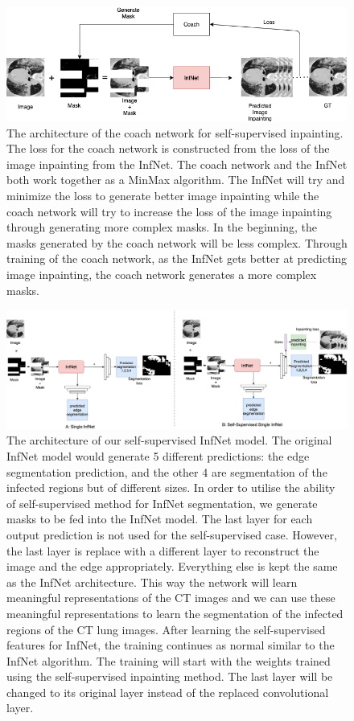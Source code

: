 \begin{figure}
	\centering
	\includegraphics[width=\linewidth]{coach.png}
	\caption{The architecture of the coach network for self-supervised inpainting. The loss for the coach network is constructed from the loss of the image inpainting from the InfNet. The coach network and the InfNet both work together as a MinMax algorithm. The InfNet will try and minimize the loss to generate better image inpainting while the coach network will try to increase the loss of the image inpainting through generating more complex masks. In the beginning, the masks generated by the coach network will be less complex. Through training of the coach network, as the InfNet gets better at predicting image inpainting, the coach network generates a more complex masks.}
\end{figure}

\begin{figure}
	\centering
	\includegraphics[width=\linewidth]{self-super-inf-net.png}
	\caption{The architecture of our self-supervised InfNet model. The original InfNet model would generate 5 different predictions: the edge segmentation prediction, and the other 4 are segmentation of the infected regions but of different sizes. In order to utilise the ability of self-supervised method for InfNet segmentation, we generate masks to be fed into the InfNet model. The last layer for each output prediction is not used for the self-supervised case. However, the last layer is replace with a different layer to reconstruct the image and the edge appropriately. Everything else is kept the same as the InfNet architecture. This way the network will learn meaningful representations of the CT images and we can use these meaningful representations to learn the segmentation of the infected regions of the CT lung images. After learning the self-supervised features for InfNet, the training continues as normal similar to the InfNet algorithm. The training will start with the weights trained using the self-supervised inpainting method. The last layer will be changed to its original layer instead of the replaced convolutional layer. }
	\label{fig:inf-net_arch}
\end{figure}

